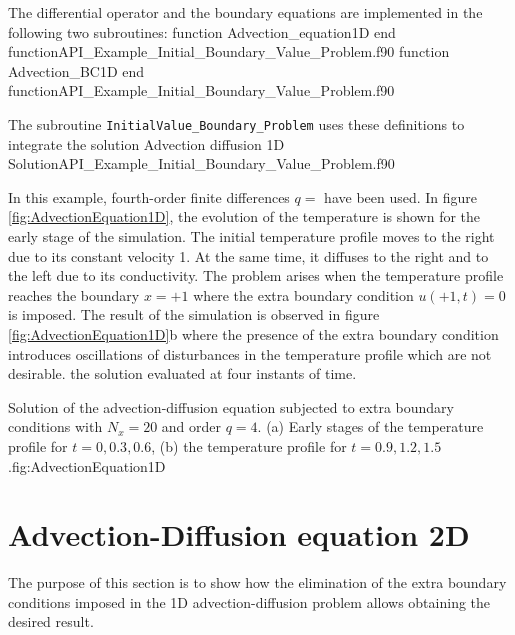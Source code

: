            
The differential operator and the boundary equations are implemented in the following two subroutines: 
\vspace{0.5cm} 
       {function Advection_equation1D}
       {end function}{API_Example_Initial_Boundary_Value_Problem.f90}
\vspace{0.5cm} 
       {function Advection_BC1D}
       {end function}{API_Example_Initial_Boundary_Value_Problem.f90}
       
      
The subroutine \verb|InitialValue_Boundary_Problem| uses these definitions to integrate the solution     
       \vspace{0.5cm} 
       {Advection diffusion 1D}
       {Solution}{API_Example_Initial_Boundary_Value_Problem.f90}
 
In this example, fourth-order finite differences $ q=$ have been used.         
In figure \ref{fig:AdvectionEquation1D}, the evolution of the temperature is shown for the early stage of the simulation. 
The initial temperature profile moves to the right due to its constant velocity 1. At the same time, it diffuses to the right and to the left due to its conductivity. The problem arises when the temperature profile   reaches the boundary $ x = + 1$ where the extra boundary condition $u(+1,t) = 0$ is imposed. The result of the simulation is observed in figure  \ref{fig:AdvectionEquation1D}b where the presence of the extra boundary condition introduces oscillations of disturbances in the temperature profile which are not desirable.   
the solution evaluated at four instants of time.

       
\twographs
{}
{}
{Solution of the advection-diffusion equation subjected to extra boundary conditions with $ N_x = 20 $ and order $ q=4$. (a) Early stages of the temperature profile for $ t=0,0.3,0.6$, (b) the temperature profile for $ t=0.9,1.2,1.5$.}{fig:AdvectionEquation1D}


    
   
\newpage    
\section{Advection-Diffusion equation 2D}
 The purpose of this section is to show how the elimination of the extra boundary conditions imposed in the 1D advection-diffusion problem allows obtaining the desired result. 
 
